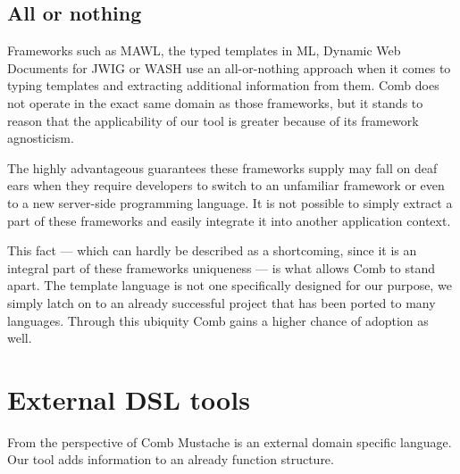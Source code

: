 \documentclass[thesis.tex]{subfiles}
\begin{document}
\subsection{All or nothing}
Frameworks such as MAWL, the typed templates in ML, Dynamic Web
Documents \cite{DYNDOC} for JWIG or WASH \cite{WASH} use an all-or-nothing
approach when it comes to typing templates and extracting additional information
from them.
Comb does not operate in the exact same domain as those frameworks, but it
stands to reason that the applicability of our tool is greater because of its
framework agnosticism.

The highly advantageous guarantees these frameworks supply may fall on deaf ears
when they require developers to switch to an unfamiliar framework or even to
a new server-side programming language. It is not possible to simply extract a
part of these frameworks and easily integrate it into another application
context.

This fact --- which can hardly be described as a shortcoming, since it is an
integral part of these frameworks uniqueness --- is what allows Comb to stand
apart. The template language is not one specifically designed for our purpose,
we simply latch on to an already successful project that has been ported to many
languages. Through this ubiquity Comb gains a higher chance of adoption as well.


\section{External DSL tools}
From the perspective of Comb Mustache is an external domain specific language.
Our tool adds information to an already function structure.
\end{document}
